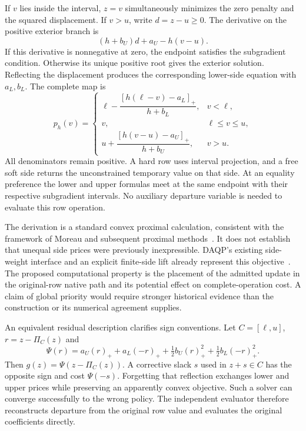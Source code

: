 If $v$ lies inside the interval, $z=v$ simultaneously minimizes the zero
penalty and the squared displacement. If $v>u$, write $d=z-u\geq0$.
The derivative on the positive exterior branch is
\begin{equation}\label{eq:paper-upper-derivative}
 (h+b_U)d+a_U-h(v-u).
\end{equation}
If this derivative is nonnegative at zero, the endpoint satisfies the
subgradient condition. Otherwise its unique positive root gives the
exterior solution. Reflecting the displacement produces the corresponding
lower-side equation with $a_L,b_L$. The complete map is
\begin{equation}\label{eq:paper-side-prox}
p_h(v)=\begin{cases}
\ell-\dfrac{[h(\ell-v)-a_L]_+}{h+b_L},&v<\ell,\\[6pt]
v,&\ell\leq v\leq u,\\[3pt]
u+\dfrac{[h(v-u)-a_U]_+}{h+b_U},&v>u.
\end{cases}
\end{equation}
All denominators remain positive. A hard row uses interval projection,
and a free soft side returns the unconstrained temporary value on that
side. At an equality preference the lower and upper formulas meet at the
same endpoint with their respective subgradient intervals. No auxiliary
departure variable is needed to evaluate this row operation.

The derivation is a standard convex proximal calculation, consistent with
the framework of Moreau and subsequent proximal methods~\cite{moreau,prox}.
It does not establish that unequal side prices were previously
inexpressible. DAQP's existing side-weight interface and an explicit
finite-side lift already represent this objective~\cite{daqp}. The proposed
computational property is the placement of the admitted update in the
original-row native path and its potential effect on complete-operation
cost. A claim of global priority would require stronger historical
evidence than the construction or its numerical agreement supplies.

An equivalent residual description clarifies sign conventions. Let
$C=[\ell,u]$, $r=z-\Pi_C(z)$ and
\begin{equation}\label{eq:paper-asym-residual}
 \Psi(r)=a_U(r)_++a_L(-r)_+
             +\tfrac12b_U(r)_+^2+\tfrac12b_L(-r)_+^2.
\end{equation}
Then $g(z)=\Psi(z-\Pi_C(z))$. A corrective slack $s$ used in
$z+s\in C$ has the opposite sign and cost $\Psi(-s)$. Forgetting
that reflection exchanges lower and upper prices while preserving an
apparently convex objective. Such a solver can converge successfully to
the wrong policy. The independent evaluator therefore reconstructs
departure from the original row value and evaluates the original
coefficients directly.

